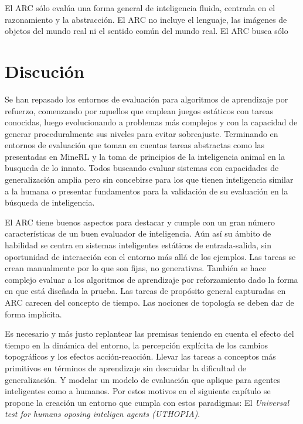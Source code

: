 El ARC sólo evalúa una forma general de inteligencia fluida, centrada en el razonamiento y la abstracción. El ARC no incluye el lenguaje, las imágenes de objetos del mundo real ni el sentido común del mundo real. El ARC busca sólo

\section{Discución}

Se han repasado los entornos de evaluación para algoritmos de aprendizaje por refuerzo, comenzando por aquellos que emplean juegos estáticos con tareas conocidas, luego evolucionando a problemas más complejos y con la capacidad de generar proceduralmente sus niveles para evitar sobreajuste. Terminando en entornos de evaluación que toman en cuentas tareas abstractas como las presentadas en MineRL y la toma de principios de la inteligencia animal en la busqueda de lo innato. Todos buscando evaluar sistemas con capacidades de generalización amplia pero sin concebirse para los que tienen inteligencia similar a la humana o presentar fundamentos para la validación de su evaluación en la búsqueda de inteligencia.

El ARC tiene buenos aspectos para destacar y cumple con un gran número características de un buen evaluador de inteligencia. Aún así su ámbito de habilidad se centra en sistemas inteligentes estáticos de entrada-salida, sin oportunidad de interacción con el entorno más allá de los ejemplos. Las tareas se crean manualmente por lo que son fijas, no generativas. También se hace complejo evaluar a los algoritmos de aprendizaje por reforzamiento dado la forma en que está diseñada la prueba. Las tareas de propósito general capturadas en ARC carecen del concepto de tiempo. Las nociones de topología se deben dar de forma implícita. 

Es necesario y más justo replantear las premisas teniendo en cuenta el efecto del tiempo en la dinámica del entorno, la percepción explícita de los cambios topográficos y los efectos acción-reacción. Llevar las tareas a conceptos más primitivos en términos de aprendizaje sin descuidar la dificultad de generalización. Y modelar un modelo de evaluación que aplique para agentes inteligentes como a humanos. Por estos motivos en el siguiente capítulo se propone la creación un entorno que cumpla con estos paradigmas: El \textit{Universal test for humans oposing inteligen agents (UTHOPIA)}.